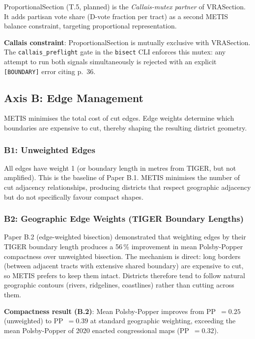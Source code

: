 ProportionalSection (T.5, planned) is the \emph{Callais-mutex partner} of
VRASection.
It adds partisan vote share (D-vote fraction per tract) as a second METIS balance
constraint, targeting proportional representation.

\textbf{Callais constraint}: ProportionalSection is mutually exclusive with
VRASection.
The \texttt{callais\_preflight} gate in the \texttt{bisect} CLI enforces
this mutex: any attempt to run both signals simultaneously is rejected with
an explicit \texttt{[BOUNDARY]} error citing \callais{} p.~36.

\subsection{Axis B: Edge Management}

METIS minimises the total cost of cut edges.
Edge weights determine which boundaries are expensive to cut, thereby shaping
the resulting district geometry.

\subsubsection*{B1: Unweighted Edges}

All edges have weight 1 (or boundary length in metres from TIGER, but not
amplified).
This is the baseline of Paper B.1.
METIS minimises the number of cut adjacency relationships, producing districts
that respect geographic adjacency but do not specifically favour compact shapes.

\subsubsection*{B2: Geographic Edge Weights (TIGER Boundary Lengths)}

Paper B.2 (edge-weighted bisection) demonstrated that weighting edges by their
TIGER boundary length produces a 56\,\% improvement in mean Polsby-Popper
compactness over unweighted bisection.
The mechanism is direct: long borders (between adjacent tracts with extensive
shared boundary) are expensive to cut, so METIS prefers to keep them intact.
Districts therefore tend to follow natural geographic contours (rivers,
ridgelines, coastlines) rather than cutting across them.

\textbf{Compactness result (B.2)}: Mean Polsby-Popper improves from PP~$=0.25$
(unweighted) to PP~$=0.39$ at standard geographic weighting, exceeding the
mean Polsby-Popper of 2020 enacted congressional maps (PP~$=0.32$).

